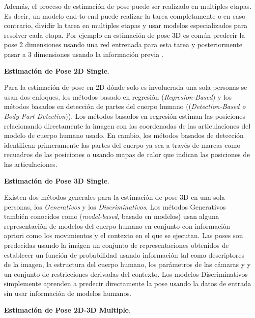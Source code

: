 Además, el proceso de estimación de pose puede ser realizado en multiples etapas. Es decir, un modelo
end-to-end puede realizar la tarea completamente o en caso contrario, dividir la tarea en multiples
etapas y usar modelos especializados para resolver cada etapa. Por ejemplo en estimación de pose 3D
es común predecir la pose 2 dimensiones usando una red entrenada para esta tarea y posteriormente
pasar a 3 dimensiones usando la información previa \cite{DBLP:journals/corr/MartinezHRL17}.

\textbf{Estimación de Pose 2D Single}.

Para la estimación de pose en 2D dónde solo es involucrada una sola personas se usan dos enfoques,
los métodos basado en regresión (\textit{Regresion-Based}) y los métodos basados en detección de
partes del cuerpo humano ((\textit{Detection-Based o Body Part Detection})). Los métodos basados en
regresión estiman las posiciones relacionando directamente la imagen con las coordenadas de las
articulaciones del modelo de cuerpo humano usado. En cambio, los métodos basados de detección
identifican primeramente las partes del cuerpo ya sea a través de marcas como recuadros de las
posiciones o usando mapas de calor que indican las posiciones de las articulaciones.

\textbf{Estimación de Pose 3D Single}.

Existen dos métodos generales para la estimación de pose 3D en una sola personas, los
\textit{Generativos} y los \textit{Discriminativos}. Los métodos Generativos
también conocidos como (\textit{model-based}, basado en modelos) usan alguna representación de modelos
del cuerpo humano en conjunto con información apriori como los movimientos y el contexto en el que se
ejecutan. Las poses son predecidas usando la imágen un conjunto de representaciones obtenidos de establecer un
función de probabilidad usando información tal como descriptores de la imagen, la estructura del cuerpo
humano, los parámetros de las cámaras y y un conjunto de restricciones derivadas del contexto. Los
modelos Discriminativos simplemente aprenden a predecir directamente la pose usando la datos de entrada
sin usar información de modelos humanos.

\textbf{Estimación de Pose 2D-3D Multiple}.


